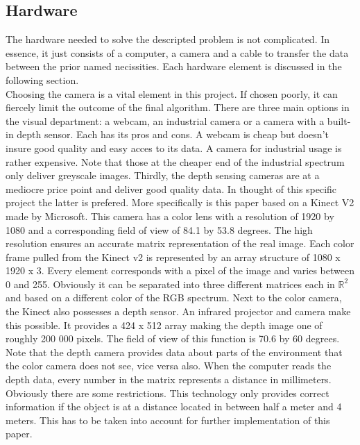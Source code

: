\documentclass[11pt]{article}
\begin{document}
\subsection{Hardware}
The hardware needed to solve the descripted problem is not complicated. In essence, it just consists of a computer, a camera and a cable to transfer the data between the prior named necissities. Each hardware element is discussed in the following section. \\Choosing the camera is a vital element in this project. If chosen poorly, it can fiercely limit the outcome of the final algorithm. There are three main options in the visual department: a webcam, an industrial camera or a camera with a built-in depth sensor. Each has its pros and cons. A webcam is cheap but doesn't insure good quality and easy acces to its data. A camera for industrial usage is rather expensive. Note that those at the cheaper end of the industrial spectrum only deliver greyscale images. Thirdly, the depth sensing cameras are at a mediocre price point and deliver good quality data. In thought of this specific project the latter is prefered. More specifically is this paper based on a Kinect V2 made by Microsoft. This camera has a color lens with a resolution of 1920 by 1080 and a corresponding field of view of 84.1 by 53.8 degrees. The high resolution ensures an accurate matrix representation of the real image. Each color frame pulled from the Kinect v2 is represented by an array structure of 1080 x 1920 x 3. Every element corresponds with a pixel of the image and varies between 0 and 255. Obviously it can be separated into three different matrices each in $\mathbb{R}^{2}$ and based on a different color of the RGB spectrum. Next to the color camera, the Kinect also possesses a depth sensor. An infrared projector and camera make this possible. It provides a 424 x 512 array making the depth image one of roughly 200 000 pixels. The field of view of this function is 70.6 by 60 degrees. Note that the depth camera provides data about parts of the environment that the color camera does not see, vice versa also. When the computer reads the depth data, every number in the matrix represents a distance in millimeters. Obviously there are some restrictions. This technology only provides correct information if the object is at a distance located in between half a meter and 4 meters. This has to be taken into account for further implementation of this paper.
\end{document}
